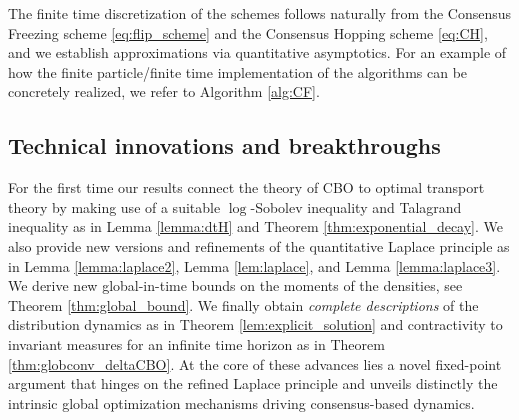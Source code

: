 \documentclass[reqno]{amsart}
\numberwithin{algorithm}{section}
\begin{document}
{The finite time discretization of the schemes follows naturally from the Consensus Freezing scheme \eqref{eq:flip_scheme} and the Consensus Hopping scheme \eqref{eq:CH}, and we establish 
approximations via quantitative asymptotics.
For an example of how the finite particle/finite time implementation of the algorithms can be concretely realized, we refer to Algorithm \ref{alg:CF}.


\subsection{Technical innovations and breakthroughs}\label{sec:advances} For the first time our results  connect the theory of CBO to optimal transport theory \cite{villani2009optimal} by making use of a suitable $\log$-Sobolev inequality and Talagrand inequality as in Lemma \ref{lemma:dtH} and Theorem \ref{thm:exponential_decay}. We also provide new versions and refinements of the quantitative Laplace principle \cite[Proposition 4.5]{B1-fornasier2021global} as in Lemma \ref{lemma:laplace2}, Lemma \ref{lem:laplace}, and Lemma \ref{lemma:laplace3}.
We derive new global-in-time bounds on the moments of the densities, see Theorem \ref{thm:global_bound}.
We finally obtain {\it complete descriptions} of the distribution dynamics as in Theorem \ref{lem:explicit_solution} and contractivity to invariant measures for an infinite time horizon as in Theorem \ref{thm:globconv_deltaCBO}. At the core of these advances lies a novel fixed-point argument that hinges on the refined Laplace principle and unveils distinctly the intrinsic global optimization mechanisms driving consensus-based dynamics. 




}
\end{document}
